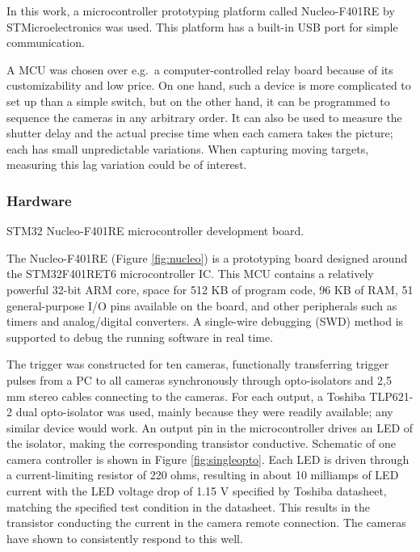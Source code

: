 In this work, a microcontroller prototyping platform called Nucleo-F401RE by STMicroelectronics \cite{stnucleo} was used.
This platform has a built-in USB port for simple communication.

A MCU was chosen over e.g.\ a computer-controlled relay board because of its customizability and low price.
On one hand, such a device is more complicated to set up than a simple switch, but on the other hand, it can be programmed to sequence the cameras in any arbitrary order.
It can also be used to measure the shutter delay and the actual precise time when each camera takes the picture; each has small unpredictable variations.
When capturing moving targets, measuring this lag variation could be of interest.

\subsubsection{Hardware}

{STM32 Nucleo-F401RE microcontroller development board.}

The Nucleo-F401RE (Figure \ref{fig:nucleo}) is a prototyping board designed around the STM32F401RET6 microcontroller IC.
This MCU contains a relatively powerful 32-bit ARM core, space for 512 KB of program code, 96 KB of RAM, 51 general-purpose I/O pins available on the board, and other peripherals such as timers and analog/digital converters.
A single-wire debugging (SWD) method is supported to debug the running software in real time. \cite{stnucleo}

The trigger was constructed for ten cameras, functionally transferring trigger pulses from a PC to all cameras synchronously through opto-isolators and 2,5 mm stereo cables connecting to the cameras.
For each output, a Toshiba TLP621-2 dual opto-isolator was used, mainly because they were readily available; any similar device would work.
An output pin in the microcontroller drives an LED of the isolator, making the corresponding transistor conductive.
Schematic of one camera controller is shown in Figure \ref{fig:singleopto}.
Each LED is driven through a current-limiting resistor of 220 ohms, resulting in about 10 milliamps of LED current with the LED voltage drop of 1.15 V specified by Toshiba datasheet, matching the specified test condition in the datasheet. \cite{tlp621}
This results in the transistor conducting the current in the camera remote connection.
The cameras have shown to consistently respond to this well.

